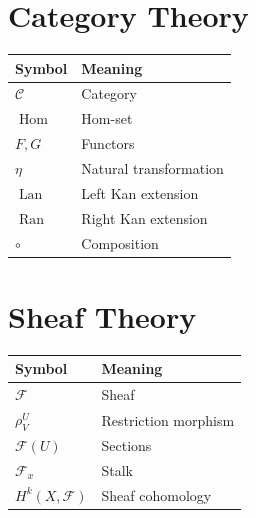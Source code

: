 \documentclass[11pt]{book}
\numberwithin{equation}{chapter}
\theoremstyle{definition}
\theoremstyle{plain}
\begin{document}

\section{Category Theory}

\begin{center}

\begin{tabular}{ll}

Symbol & Meaning
\\
\hline

$\mathcal C$ &
Category
\\

$\operatorname{Hom}$ &
Hom-set
\\

$F,G$ &
Functors
\\

$\eta$ &
Natural transformation
\\

$\operatorname{Lan}$ &
Left Kan extension
\\

$\operatorname{Ran}$ &
Right Kan extension
\\

$\circ$ &
Composition

\end{tabular}

\end{center}


\section{Sheaf Theory}

\begin{center}

\begin{tabular}{ll}

Symbol & Meaning
\\
\hline

$\mathcal F$ &
Sheaf
\\

$\rho^U_V$ &
Restriction morphism
\\

$\mathcal F(U)$ &
Sections
\\

$\mathcal F_x$ &
Stalk
\\

$H^k(X,\mathcal F)$ &
Sheaf cohomology

\end{tabular}

\end{center}
\end{document}
